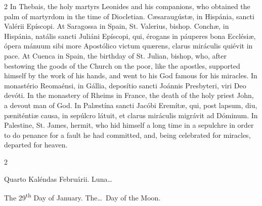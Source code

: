 \begin{paracol}{2}
\switchcolumn
{}
In Thebais, the holy martyrs Leonides and his companions, who obtained the 
 palm of martyrdom in the time of Diocletian.
\switchcolumn*
{}
Cæsaraugústæ, in Hispánia, sancti Valérii 
 Epíscopi.
\switchcolumn
{}
At Saragossa in Spain, St. Valerius, bishop.
\switchcolumn*
{}
Conchæ, in Hispánia, natális sancti Juliáni 
 Epíscopi, qui, érogans in páuperes bona Ecclésiæ, ópera mánuum sibi more 
 Apostólico victum quærens, clarus miráculis quiévit in pace.
\switchcolumn
{}
At Cuenca in Spain, the birthday of St. Julian, bishop, who, after bestowing 
 the goods of the Church on the poor, like the apostles, supported himself by the work of 
 his hands, and went to his God famous for his miracles.
\switchcolumn*
{}
In monastério Reomaénsi, in Gállia, deposítio sancti Joánnis Presbyteri, 
 viri Deo devóti.
\switchcolumn
{}
In the monastery of Rheims in France, the death of the holy priest John, a 
 devout man of God.
\switchcolumn*
{}
In Palæstína sancti Jacóbi Eremítæ, qui, post 
 lapsum, diu, pæniténtiæ causa, in sepúlcro látuit, et clarus miráculis 
 migrávit ad Dóminum.
\switchcolumn
{}
In Palestine, St. James, hermit, who hid himself a long time in a sepulchre 
 in order to do penance for a fault he had committed, and, being celebrated 
 for miracles, departed for heaven.
\switchcolumn*
{}
\end{paracol}


\begin{paracol}{2}
\begin{center}{\color{gregoriocolor} Quarto Kaléndas Februárii. 
 Luna\dots\ }\end{center}
\switchcolumn
{}
\begin{center}{\color{gregoriocolor} The 29\textsuperscript{th} Day of 
 January. The\dots\ Day of the Moon.}\end{center}
\end{paracol}

